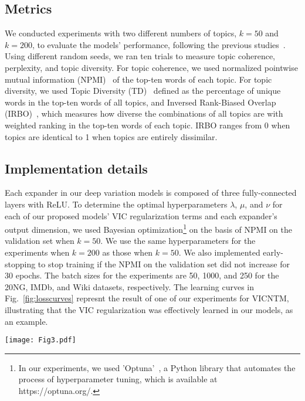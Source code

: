 \documentclass{article}
\begin{document}
\subsection{Metrics}\label{sec42}
We conducted experiments with two different numbers of topics, $k=50$ and $k=200$, to evaluate the models' performance, following the previous studies~\cite{srivastava2017autoencoding,hoyle2020improving,nguyen2021contrastive}. 
Using different random seeds, we ran ten trials to measure topic coherence, perplexity, and topic diversity. 
For topic coherence, we used normalized pointwise mutual information (NPMI)~\cite{lau2014machine} of the top-ten words of each topic. 
For topic diversity, we used Topic Diversity (TD)~\cite{dieng2020topic} defined as the percentage of unique words in the top-ten words of all topics, and Inversed Rank-Biased Overlap (IRBO)~\cite{terragni2021word,bianchi2021pre}, which measures how diverse the combinations of all topics are with weighted ranking in the top-ten words of each topic. IRBO ranges from 0 when topics are identical to 1 when topics are entirely dissimilar.

\subsection{Implementation details}\label{sec43}
Each expander in our deep variation models is composed of three fully-connected layers with ReLU.
To determine the optimal hyperparameters $\lambda$, $\mu$, and $\nu$ for each of our proposed models' VIC regularization terms and each expander's output dimension, we used Bayesian optimization\footnote{In our experiments, we used 'Optuna'~\cite{akiba2019optuna}, a Python library that automates the process of hyperparameter tuning, which is available at https://optuna.org/.} on the basis of NPMI on the validation set when $k=50$. 
We use the same hyperparameters for the experiments when $k=200$ as those when $k=50$.
We also implemented early-stopping to stop training if the NPMI on the validation set did not increase for 30 epochs. 
The batch sizes for the experiments are 50, 1000, and 250 for the 20NG, IMDb, and Wiki datasets, respectively.
The learning curves in Fig.~\ref{fig:losscurves} represnt the result of one of our experiments for VICNTM, illustrating that the VIC regularization was effectively learned in our models, as an example.
\begin{figure*}[ht]
    \centering
    \texttt{[image: Fig3.pdf]}
    \caption{{\bf Learning curves that confirm the three regularization losses were effectively learned}} \label{fig:losscurves}
\end{figure*}
\end{document}
